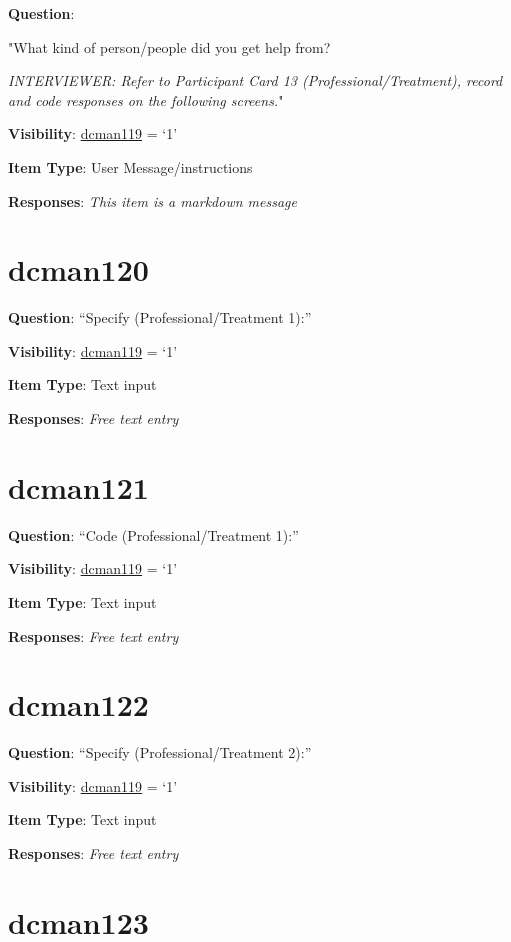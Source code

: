 \documentclass[]{book}
\begin{document}
\textbf{Question}:

"What kind of person/people did you get help from?

\emph{INTERVIEWER: Refer to Participant Card 13 (Professional/Treatment), record and code responses on the following screens.}"

\textbf{Visibility}: \protect\hyperlink{dcman119}{dcman119} = `1'

\textbf{Item Type}: User Message/instructions

\textbf{Responses}: \emph{This item is a markdown message}

\hypertarget{dcman120}{%
\section{dcman120}\label{dcman120}}

\textbf{Question}: ``Specify (Professional/Treatment 1):''

\textbf{Visibility}: \protect\hyperlink{dcman119}{dcman119} = `1'

\textbf{Item Type}: Text input

\textbf{Responses}: \emph{Free text entry}

\hypertarget{dcman121}{%
\section{dcman121}\label{dcman121}}

\textbf{Question}: ``Code (Professional/Treatment 1):''

\textbf{Visibility}: \protect\hyperlink{dcman119}{dcman119} = `1'

\textbf{Item Type}: Text input

\textbf{Responses}: \emph{Free text entry}

\hypertarget{dcman122}{%
\section{dcman122}\label{dcman122}}

\textbf{Question}: ``Specify (Professional/Treatment 2):''

\textbf{Visibility}: \protect\hyperlink{dcman119}{dcman119} = `1'

\textbf{Item Type}: Text input

\textbf{Responses}: \emph{Free text entry}

\hypertarget{dcman123}{%
\section{dcman123}\label{dcman123}}
\end{document}
